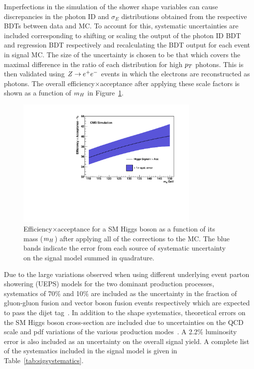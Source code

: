 Imperfections in the simulation of the shower shape variables can cause discrepancies in the photon 
ID and $\sigma_{E}$ distributions obtained from the respective BDTs between data and MC. To account for this, 
systematic uncertainties are included corresponding to shifting or scaling the output of the photon ID BDT 
and regression BDT respectively and recalculating the BDT output for each event in signal MC. The size 
of the uncertainty is chosen to be that which covers the maximal difference in the ratio of each 
distribution for high $p_{T}$ photons. This is then validated using $Z\rightarrow e^{+}e^{-}$ events in which the 
electrons are reconstructed as photons.
The overall efficiency$\times$acceptance after applying 
these scale factors is shown as a function of $m_{H}$ in Figure~\ref{fig:effacc}. 
\begin{figure}
\includegraphics[width=0.8\textwidth]{hgg7TeV/generalPlots/effAcc_vs_mass.pdf}
\caption{Efficiency$\times$acceptance for a SM Higgs boson as a function of its mass ($m_{H}$) after
applying all of the corrections to the MC. The blue bands indicate the error from each source of 
systematic uncertainty on the signal model summed in quadrature.}
\label{fig:effacc}
\end{figure}
Due to the large variations observed when using different underlying event parton showering (UEPS) models
for the two dominant production processes, systematics of 70\% and 10\% are included as the uncertainty
in the fraction of gluon-gluon fusion and vector boson fusion events respectively which
are expected to pass the dijet tag~\citep{HIG-11-033}.
In addition to the shape systematics, theoretical errors on the SM Higgs boson cross-section are 
included due to uncertainties on the QCD scale and pdf variations of the various
production modes~\citep{lhcxswg}. A 2.2\% luminosity error is also included as an uncertainty
on the overall signal yield.
A complete list of the systematics included in the signal model is given in Table~\ref{tab:sigsystematics}.

